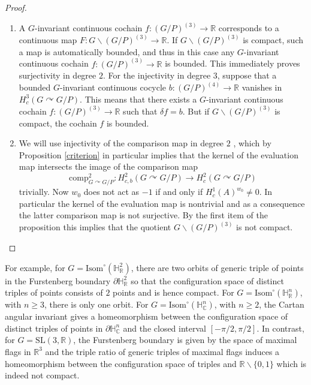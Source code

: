 \documentclass[a4paper]{amsart}
\theoremstyle{definition}
\theoremstyle{remark}
\theoremstyle{TheoremNum}
\renewcommand{\setminus}{\smallsetminus}
\begin{document}
\begin{proof} \begin{enumerate} \item A $G$-invariant continuous cochain $f:(G/P)^{(3)}\rightarrow \mathbb{R}$ corresponds to a continuous map $F:G\backslash (G/P)^{(3)}\rightarrow \mathbb{R}$. If $G\backslash (G/P)^{(3)}$ is compact, such a map is automatically bounded, and thus in this case any $G$-invariant continuous cochain $f:(G/P)^{(3)}\rightarrow \mathbb{R}$ is bounded. This immediately proves surjectivity in degree $2$. For the injectivity in degree $3$, suppose that a bounded $G$-invariant continuous cocycle $b: (G/P)^{(4)}\rightarrow \mathbb{R}$ vanishes in $H^3_c(G \curvearrowright G/P)
$. This means that there exists a $G$-invariant continuous cochain $f:(G/P)^{(3)}\rightarrow \mathbb{R}$ such that $\delta f=b$. But if $G\backslash (G/P)^{(3)}$ is compact, the cochain $f$ is bounded. 
\item We will use injectivity of the comparison map in degree $2$  \cite{BM99}, which by Proposition \ref{criterion} in particular implies that the kernel of the evaluation map intersects the image of the comparison map 
$$
\mathrm{comp}^2_{G \curvearrowright G/P}:H^2_{c,b}(G \curvearrowright G/P) \longrightarrow H^2_c(G \curvearrowright G/P)
$$
trivially. Now $w_0$ does not act as $-1$ if and only if $H^1_c(A)^{w_0}\neq 0$. In particular the kernel of the evaluation map is nontrivial and as a consequence the latter comparison map is not surjective. By the first item of the proposition this implies that the quotient $G\backslash (G/P)^{(3)}$ is not compact. 
\end{enumerate}
\end{proof}

For example, for $G=\mathrm{Isom}^\circ(\mathbb{H}^2_\mathbb{R})$, there are two orbits of generic triple of points in the Furstenberg boundary $\partial \mathbb{H}^2_\mathbb{R}$ so that the configuration space of distinct triples of points consists of $2$ points and is hence compact. For $G=\mathrm{Isom}^\circ(\mathbb{H}^n_\mathbb{R})$, with $n\geq 3$, there is only one orbit. For $G=\mathrm{Isom}^\circ(\mathbb{H}^n_\mathbb{C})$, with $n\geq 2$, the Cartan angular invariant gives a homeomorphism between the configuration space of distinct triples of points in $\partial \mathbb{H}^n_\mathbb{C}$ and the closed interval $[-\pi/2,\pi/2]$. In contrast, for $G=\mathrm{SL}(3,\mathbb{R})$, the Furstenberg boundary is given by the space of maximal flags in $\mathbb{R}^3$ and the triple ratio of generic triples of maximal flags induces a homeomorphism between the configuration space of triples and $\mathbb{R}\setminus \{0,1\}$ which  is indeed not compact. 
\end{document}

